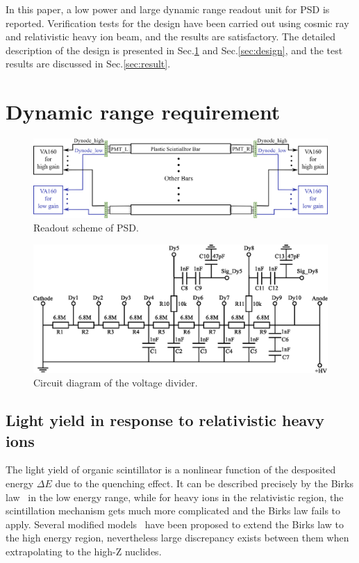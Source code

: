 \documentclass[5p, times]{elsarticle}
\begin{document}
In this paper, a low power and large dynamic range readout unit for PSD is reported.
Verification tests for the design have been carried out using cosmic ray and relativistic heavy ion beam, and the results are satisfactory.
The detailed description of the design is presented in Sec.\ref{sec:requirement} and Sec.\ref{sec:design}, and the test results are discussed in Sec.\ref{sec:result}.

\section{Dynamic range requirement}
\label{sec:requirement}

\begin{figure}
\centering
 \includegraphics[width=140mm]{readout_scheme}
\caption{Readout scheme of PSD.}
\label{fig:readout_scheme}
\end{figure} 

\begin{figure}
\centering
 \includegraphics[width=130mm]{divider}
\caption{Circuit diagram of the voltage divider.}
\label{fig:divider}
\end{figure} 

\subsection{Light yield in response to relativistic heavy ions}
\label{sec:light_yield}
The light yield of organic scintillator is a nonlinear function of the desposited energy $\Delta E$ due to the quenching effect.
It can be described precisely by the Birks law~\cite{birks_theory_2013} in the low energy range, while for heavy ions in the relativistic region, the scintillation mechanism gets much more complicated and the Birks law fails to apply.
Several modified models~\cite{chou_nature_1952,tarle_cosmic_1979,menchaca-rocha_response_1999,matsufuji_response_1999} have been proposed to extend the Birks law to the high energy region, nevertheless large discrepancy exists between them when extrapolating to the high-Z nuclides.
\end{document}
